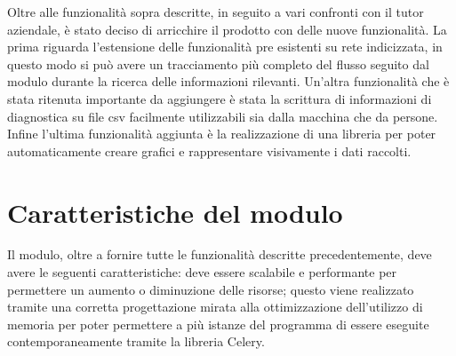 Oltre alle funzionalità sopra descritte, in seguito a vari confronti con il tutor aziendale, è stato deciso di arricchire il prodotto con delle nuove funzionalità. \newline{}
La prima riguarda l'estensione delle funzionalità pre esistenti su rete indicizzata, in questo modo si può avere un tracciamento più completo del flusso seguito dal modulo durante la ricerca delle informazioni rilevanti. Un'altra funzionalità che è stata ritenuta importante da aggiungere è stata la scrittura di informazioni di diagnostica su file csv facilmente utilizzabili sia dalla macchina che da persone. \newline{} Infine l'ultima funzionalità aggiunta è la realizzazione di una libreria per poter automaticamente creare grafici e rappresentare visivamente i dati raccolti.


\section{Caratteristiche del modulo}

Il modulo, oltre a fornire tutte le funzionalità descritte precedentemente, deve avere le
seguenti caratteristiche: deve essere scalabile e performante per permettere un aumento o diminuzione delle risorse; questo viene realizzato tramite una corretta progettazione mirata alla ottimizzazione dell'utilizzo di memoria per poter permettere a più istanze del programma di essere eseguite contemporaneamente tramite la libreria Celery.
